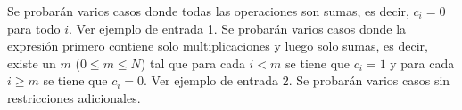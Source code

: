 \documentclass{oci}
\begin{document}
\begin{scoreDescription}
   Se probarán varios casos donde todas las operaciones son sumas, es decir,
  $c_i = 0$ para todo $i$.
  Ver ejemplo de entrada 1.
   Se probarán varios casos donde la expresión primero contiene solo
  multiplicaciones y luego solo sumas, es decir, existe un $m$ ($0 \leq m \leq
  N$) tal que para cada $i < m$ se tiene que $c_i = 1$ y para cada $i \geq m$
  se tiene que $c_i = 0$.
  Ver ejemplo de entrada 2. 
   Se probarán varios casos sin restricciones adicionales.
\end{scoreDescription}

\begin{sampleDescription}
\end{sampleDescription}
\end{document}
